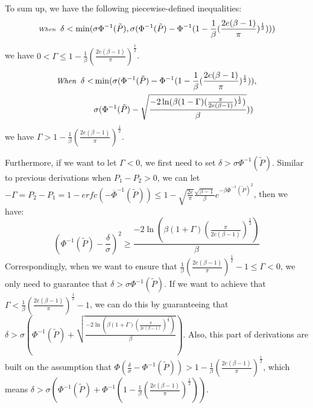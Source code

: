 To sum up, we have the following piecewise-defined inequalities:
\begin{equation}
\scriptsize
\textit{When}\;\;\delta < \min(\sigma\Phi^{-1}(\tilde{P}),\sigma(\Phi^{-1}(\tilde{P})-\Phi^{-1}(1-\frac{1}{\beta}(\frac{2e(\beta-1)}{\pi})^{\frac{1}{2}})))
\end{equation}
we have $0<\Gamma\leq1-\frac{1}{\beta}(\frac{2e(\beta-1)}{\pi})^{\frac{1}{2}}$.
\begin{align}
\begin{split}
\small
\textit{When}\;\; \delta<&\min(\sigma(\Phi^{-1}(\tilde{P})-\Phi^{-1}(1-\frac{1}{\beta}(\frac{2e(\beta-1)}{\pi})^{\frac{1}{2}})),\\
&\sigma(\Phi^{-1}(\tilde{P})-\sqrt{\frac{-2\ln(\beta(1-\Gamma)(\frac{\pi}{2e(\beta-1)})^{\frac{1}{2}})}{\beta}}))
\end{split}
\end{align}
we have $\Gamma>1-\frac{1}{\beta}(\frac{2e(\beta-1)}{\pi})^{\frac{1}{2}}$.

Furthermore, if we want to let $\Gamma<0$, we first need to set $\delta>\sigma\Phi^{-1}(\tilde{P})$. Similar to previous derivations when $P_1 - P_2>0$, we can let $-\Gamma=P_2 - P_1=1 - \textit{erfc}(-\overline{\Phi}^{-1}(\tilde{P}))\leq1 - \sqrt{\frac{2e}{\pi}}\frac{\sqrt{\beta-1}}{\beta}e^{-\beta\overline{\Phi}^{-1}(\tilde{P})^2}$, then we have:
\begin{equation}
(\Phi^{-1}(\tilde{P})-\frac{\delta}{\sigma})^2\geq\frac{-2\ln(\beta(1+\Gamma)(\frac{\pi}{2e(\beta-1)})^{\frac{1}{2}})}{\beta}
\end{equation}
Correspondingly, when we want to ensure that $\frac{1}{\beta}(\frac{2e(\beta-1)}{\pi})^{\frac{1}{2}}-1\leq\Gamma<0$, we only need to guarantee that $\delta>\sigma\Phi^{-1}(\tilde{P})$. If we want to achieve that $\Gamma<\frac{1}{\beta}(\frac{2e(\beta-1)}{\pi})^{\frac{1}{2}}-1$, we can do this by guaranteeing that $\delta>\sigma(\Phi^{-1}(\tilde{P})+\sqrt{\frac{-2\ln(\beta(1+\Gamma)(\frac{\pi}{2e(\beta-1)})^{\frac{1}{2}})}{\beta}})$. Also, this part of derivations are built on the assumption that $\Phi(\frac{\delta}{\sigma}-\Phi^{-1}(\tilde{P}))>1-\frac{1}{\beta}(\frac{2e(\beta-1)}{\pi})^{\frac{1}{2}}$, which means $\delta>\sigma(\Phi^{-1}(\tilde{P})+\Phi^{-1}(1-\frac{1}{\beta}(\frac{2e(\beta-1)}{\pi})^{\frac{1}{2}}))$.


